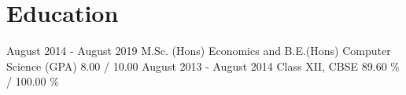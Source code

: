 \section{Education}\label{sec:education}
\startListPointOneInchAwayFromLeft
{} {August 2014 - August 2019} {M.Sc. (Hons) Economics and B.E.(Hons) Computer Science} {(GPA) 8.00 / 10.00}
 {August 2013 - August 2014} {Class XII, CBSE} {89.60 \% / 100.00 \%}
\makeLinePointOneInchAwayEnd